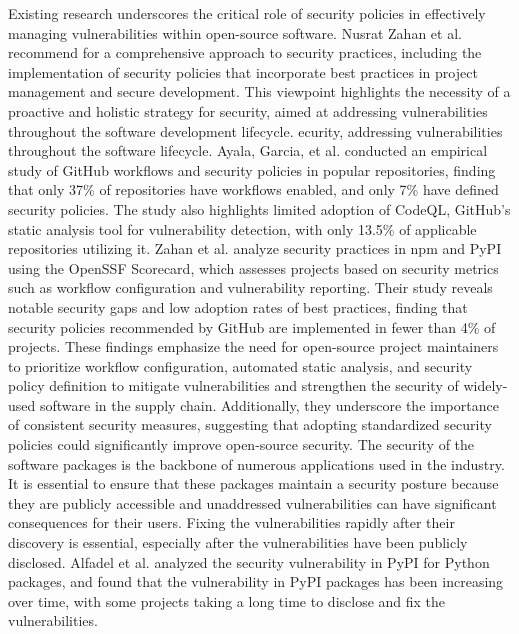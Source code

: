 Existing research underscores the critical role of security policies in effectively managing vulnerabilities within open-source software. Nusrat Zahan et al. \cite{zahan2023softwaresecuritypracticesyield} recommend for a comprehensive approach to security practices, including the implementation of security policies that incorporate best practices in project management and secure development. This viewpoint highlights the necessity of a proactive and holistic strategy for security, aimed at addressing vulnerabilities throughout the software development lifecycle.
ecurity, addressing vulnerabilities throughout the software lifecycle.
Ayala, Garcia, et al. \cite{10190609} conducted an empirical study of GitHub workflows and security policies in popular repositories, finding that only 37\% of repositories have workflows enabled, and only 7\% have defined security policies. The study also highlights limited adoption of CodeQL, GitHub's static analysis tool for vulnerability detection, with only 13.5\% of applicable repositories utilizing it. Zahan et al. \cite{10163720} analyze security practices in npm and PyPI using the OpenSSF Scorecard, which assesses projects based on security metrics such as workflow configuration and vulnerability reporting. Their study reveals notable security gaps and low adoption rates of best practices, finding that security policies recommended by GitHub are implemented in fewer than 4\% of projects. 
These findings emphasize the need for open-source project maintainers to prioritize workflow configuration, automated static analysis, and security policy definition to mitigate vulnerabilities and strengthen the security of widely-used software in the supply chain. Additionally, they underscore the importance of consistent security measures, suggesting that adopting standardized security policies could significantly improve open-source security.
The security of the software packages is the backbone of numerous applications used in the industry. It is essential to ensure that these packages maintain a security posture because they are publicly accessible and unaddressed vulnerabilities can have significant consequences for their users. Fixing the vulnerabilities rapidly after their discovery is essential, especially after the vulnerabilities have been publicly disclosed. Alfadel et al. \cite{EmpiricalAnalysisOfSecurityVulnerabilitiesInPythonPackages} analyzed the security vulnerability in PyPI for Python packages, and found that the vulnerability in PyPI packages has been increasing over time, with some projects taking a long time to disclose and fix the vulnerabilities.

